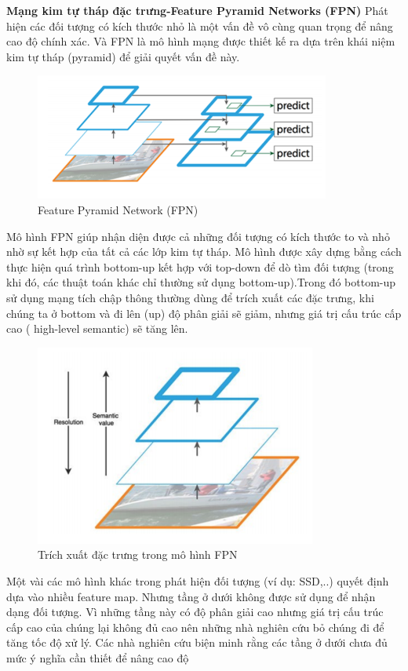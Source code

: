\documentclass[a4paper, 12pt]{report}
\begin{document}
\textbf{Mạng kim tự tháp đặc trưng-Feature Pyramid Networks (FPN)} 
Phát hiện các đối tượng có kích thước nhỏ là một vấn đề vô cùng quan
trọng để nâng cao độ chính xác. Và FPN là mô hình mạng được thiết kế
ra dựa trên khái niệm kim tự tháp (pyramid) để giải quyết vấn đề này. \\
\begin{figure}[!h]
	\centering
	\includegraphics[width=0.5\linewidth]{Images/fpn1}
	\caption{Feature Pyramid Network (FPN)}
	\label{fig:resnet-fpn1}
\end{figure}
\hspace*{1cm}Mô hình FPN giúp nhận diện được cả những đối tượng có kích thước
to và nhỏ nhờ sự kết hợp của tất cả các lớp kim tự tháp. Mô hình được
xây dựng bằng cách thực hiện quá trình bottom-up kết hợp với top-down
để dò tìm đối tượng (trong khi đó, các thuật toán khác chỉ thường sử dụng
bottom-up).Trong đó bottom-up sử dụng mạng tích chập thông thường
dùng để trích xuất các đặc trưng, khi chúng ta ở bottom và đi lên (up) độ
phân giải sẽ giảm, nhưng giá trị cấu trúc cấp cao ( high-level semantic) sẽ
tăng lên. \\
\begin{figure}[!h]
	\centering
	\includegraphics[width=0.5\linewidth]{Images/fpn2}
	\caption{Trích xuất đặc trưng trong mô hình FPN}
	\label{fig:resnet-fpn2}
\end{figure}
Một vài các mô hình khác trong phát hiện đối tượng (ví dụ: SSD,..)
quyết định dựa vào nhiều feature map. Nhưng tầng ở dưới không được
sử dụng để nhận dạng đối tượng. Vì những tầng này có độ phân giải cao
nhưng giá trị cấu trúc cấp cao của chúng lại không đủ cao nên những nhà
nghiên cứu bỏ chúng đi để tăng tốc độ xử lý. Các nhà nghiên cứu biện
minh rằng các tầng ở dưới chưa đủ mức ý nghĩa cần thiết để nâng cao độ
\end{document}
